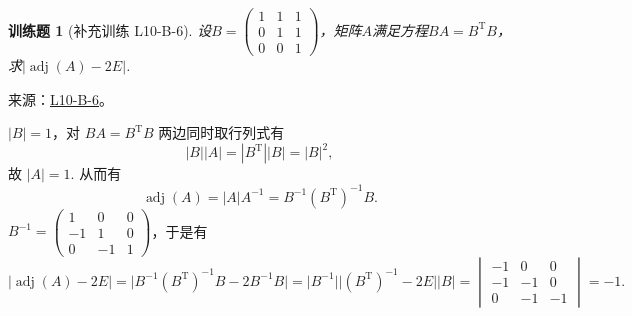 \documentclass[12pt,fontset=fandol]{ctexart}
\newtheorem{exercise}{训练题}[section]
\begin{document}
\begin{exercise}[补充训练 L10-B-6]\label{prob:L10-B-6}
设$B=\begin{pmatrix}
                1 & 1 & 1 \\ 0 & 1 & 1 \\ 0 & 0 & 1
            \end{pmatrix}$，矩阵$A$满足方程$BA=B^\mathrm{T}B$，求$|\operatorname{adj}(A)-2E|$.
\end{exercise}
\noindent 来源：\href{https://github.com/yhwu-is/Linear-Algebra-Left-Undone/blob/new/%E8%AE%B2%E4%B9%89/%E4%B8%93%E9%A2%98/10%20%E8%A1%8C%E5%88%97%E5%BC%8F.tex}{L10-B-6}。
\begin{solve}
$|B|=1$，对 $BA=B^\mathrm{T}B$ 两边同时取行列式有
            \[
                |B||A| = |B^\mathrm{T}||B| = |B|^2,
            \]
            故 $|A| = 1$. 从而有
            \[
                \operatorname{adj}(A) = |A|A^{-1} = B^{-1} \left(B^\mathrm{T}\right)^{-1} B.
            \]
            $B^{-1} = \begin{pmatrix}
                1 & 0 & 0 \\ -1 & 1 & 0 \\ 0 & -1 & 1
            \end{pmatrix}$，于是有
            \[
                |\operatorname{adj}(A)-2E| = \lvert B^{-1} \left(B^\mathrm{T}\right)^{-1} B - 2 B^{-1} B \rvert
                         = \lvert B^{-1} \rvert \lvert \left(B^\mathrm{T}\right)^{-1} - 2E \rvert \lvert B \rvert
                         = \begin{vmatrix}
                            -1 & 0 & 0 \\ -1 & -1 & 0 \\ 0 & -1 & -1
                         \end{vmatrix}
                         = -1.
            \]
\end{solve}
\end{document}
